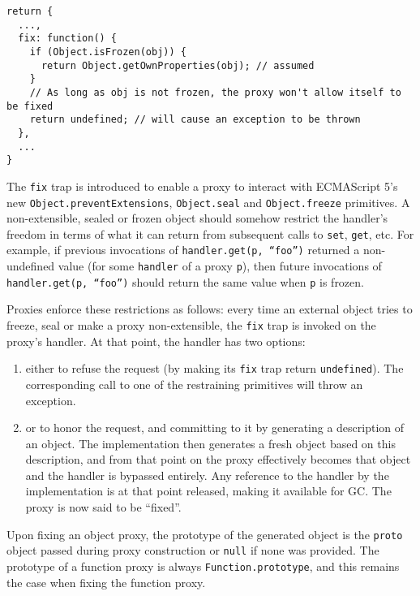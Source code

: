 \documentclass{acm_proc_article-sp}
\begin{document}

\begin{lstlisting}
return {
  ...,
  fix: function() {
    if (Object.isFrozen(obj)) {
      return Object.getOwnProperties(obj); // assumed
    }
    // As long as obj is not frozen, the proxy won't allow itself to be fixed
    return undefined; // will cause an exception to be thrown
  },
  ...
}
\end{lstlisting}

The \texttt{fix} trap is introduced to enable a proxy to interact with ECMAScript 5's new \texttt{Object.preventExtensions}, \texttt{Object.seal} and \texttt{Object.freeze} primitives. A non-extensible, sealed or frozen object should somehow restrict the handler’s freedom in terms of what it can return from subsequent calls to \texttt{set}, \texttt{get}, etc. For example, if previous invocations of \texttt{handler.get(p, ``foo'')} returned a non-undefined value (for some \texttt{handler} of a proxy \texttt{p}), then future invocations of \texttt{handler.get(p, ``foo'')} should return the same value when \texttt{p} is frozen.

Proxies enforce these restrictions as follows: every time an external object tries to freeze, seal or make a proxy non-extensible, the \texttt{fix} trap is invoked on the proxy’s handler. At that point, the handler has two options:
\begin{enumerate}
  \item either to refuse the request (by making its \texttt{fix} trap return \texttt{undefined}). The corresponding call to one of the restraining primitives will throw an exception.
  \item or to honor the request, and committing to it by generating a description of an object. The implementation then generates a fresh object based on this description, and from that point on the proxy effectively becomes that object and the handler is bypassed entirely. Any reference to the handler by the implementation is at that point released, making it available for GC. The proxy is now said to be ``fixed''.  
\end{enumerate}

Upon fixing an object proxy, the prototype of the generated object is the \texttt{proto} object passed during proxy construction or \texttt{null} if none was provided. The prototype of a function proxy is always \texttt{Function.prototype}, and this remains the case when fixing the function proxy.
\end{document}
